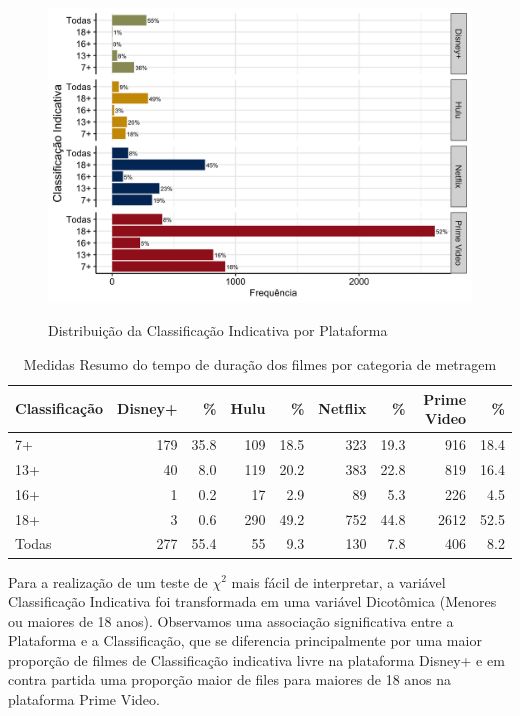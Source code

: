 \documentclass[a4paper, 12pt]{article} %
\begin{document}
\begin{figure}[H]
    \centering
    \caption{Distribuição da Classificação Indicativa por Plataforma}
    \includegraphics[scale=0.25]{Fig_Classificacao_Plataforma.png}
    \label{fig:my_label}
\end{figure}


\begin{table}[H]
\caption{Medidas Resumo do tempo de duração dos filmes por categoria de metragem}
\centering
\begin{tabular}{l|rrrrrrrr}
\hline
\multicolumn{1}{l|}{\textbf{Classificação}} &
\multicolumn{1}{r}{\textbf{Disney+}} &
\multicolumn{1}{r}{\textbf{\%}} &
\multicolumn{1}{r}{\textbf{Hulu}}&
\multicolumn{1}{r}{\textbf{\%}}&
\multicolumn{1}{r}{\textbf{Netflix}}&
\multicolumn{1}{r}{\textbf{\%}}&
\multicolumn{1}{r}{\textbf{Prime Video}}&
\multicolumn{1}{r}{\textbf{\%}}\\
\hline

 7+ & 179 & 35.8 & 109 & 18.5 & 323 & 19.3 & 916 & 18.4 \\
 13+ &  40 & 8.0 & 119 & 20.2 & 383 & 22.8 & 819 & 16.4 \\
 16+ & 1 & 0.2 & 17 & 2.9 & 89 & 5.3 & 226 & 4.5  \\
 18+ & 3 & 0.6 & 290 & 49.2 & 752 & 44.8 & 2612 & 52.5   \\
Todas &  277 & 55.4 &  55 & 9.3 &  130 & 7.8 &  406 & 8.2  \\
\hline
\end{tabular}
\end{table}

Para a realização de um teste de $\chi^2$ mais fácil de interpretar, a variável Classificação Indicativa foi transformada em uma variável Dicotômica (Menores ou maiores de 18 anos). Observamos uma associação significativa entre a Plataforma e a Classificação, que se diferencia principalmente por uma maior proporção de filmes de Classificação indicativa livre na plataforma Disney+ e em contra partida uma proporção maior de files para maiores de 18 anos na plataforma Prime Video.
\end{document}
